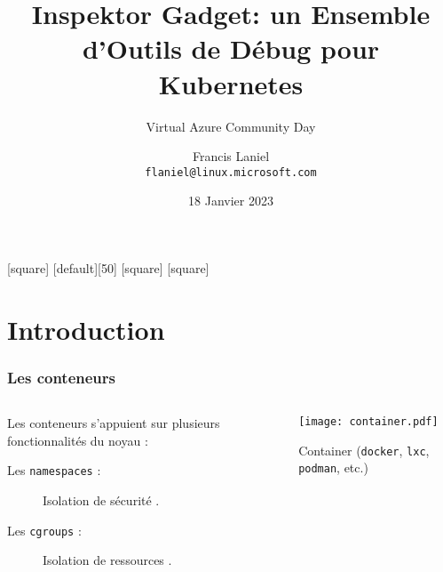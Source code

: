 \documentclass[table, trans, aspectratio = 169]{beamer}
\title[Azure Community Day 2023]{Inspektor Gadget: un Ensemble d'Outils de Débug pour Kubernetes}
\subtitle{Virtual Azure Community Day}
\author[Francis Laniel (\texttt{flaniel@linux.microsoft.com})]{Francis Laniel\\\texttt{flaniel@linux.microsoft.com}}
\date{18 Janvier 2023}
\begin{document}
	[square]
	[default][50]
	[square]
	[square]

	\maketitle

	\section{Introduction}
	\begin{frame}
		\frametitle{Les conteneurs}

		\begin{columns}
			\begin{column}{.5\textwidth}
				Les conteneurs s'appuient sur plusieurs fonctionnalités du noyau :
				\begin{description}
					\item[Les \texttt{namespaces} :] Isolation de sécurité \cite{rami_rosen_namespace_2016, kerrisk_lce_2012, kerrisk_namespaces_2013}.
					\item[Les \texttt{cgroups} :] Isolation de ressources \cite{rami_rosen_namespace_2016, hiroyu_cgroup_2008}.
				\end{description}
			\end{column}
			\begin{column}{.5\textwidth}
				\centering

				\texttt{[image: container.pdf]}

				Container (\texttt{docker}, \texttt{lxc}, \texttt{podman}, etc.)
			\end{column}
		\end{columns}
	\end{frame}
\end{document}
